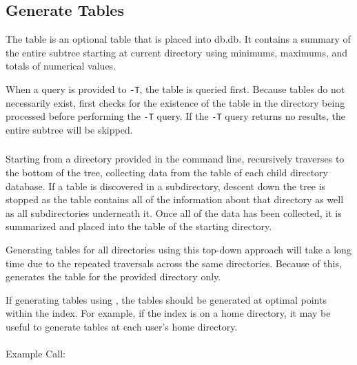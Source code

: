 \subsection{Generate \treesummary Tables}
\label{sec:treesummary}
The \treesummary table is an optional table that is placed into
db.db. It contains a summary of the entire subtree starting at current
directory using minimums, maximums, and totals of numerical values.

When a query is provided to \gufiquery \texttt{-T}, the \treesummary
table is queried first. Because \treesummary tables do not necessarily
exist, \gufiquery first checks for the existence of the \treesummary
table in the directory being processed before performing the
\texttt{-T} query. If the \texttt{-T} query returns no results, the
entire subtree will be skipped.

\subsubsection{\gufitreesummary}
Starting from a directory provided in the command line,
\gufitreesummary recursively traverses to the bottom of the tree,
collecting data from the \summary table of each child directory
database. If a \treesummary table is discovered in a subdirectory,
descent down the tree is stopped as the \treesummary table contains
all of the information about that directory as well as all
subdirectories underneath it. Once all of the data has been collected,
it is summarized and placed into the \treesummary table of the
starting directory.

Generating \treesummary tables for all directories using this top-down
approach will take a long time due to the repeated traversals across
the same directories. Because of this, \gufitreesummary generates the
\treesummary table for the provided directory only.

If generating \treesummary tables using \gufitreesummary, the tables
should be generated at optimal points within the index. For example,
if the index is on a home directory, it may be useful to generate
\treesummary tables at each user's home directory.
\\\\
Example Call:
\\\\
\indent \gufitreesummary \indexroot

